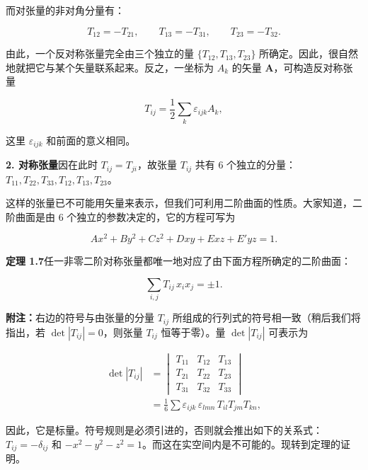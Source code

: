 \documentclass[11pt,a4paper,oneside]{ctexbook}
\newcommand{\ve}[1]{\bm{#1}}
\begin{document}
而对张量的非对角分量有：

\begin{equation*}
T_{12} = -T_{21}, \qquad T_{13} = -T_{31}, \qquad T_{23} = -T_{32}.
\end{equation*}

由此，一个反对称张量完全由三个独立的量 $\{T_{12}, T_{13}, T_{23}\}$ 所确定。因此，很自然地就把它与某个矢量联系起来。反之，一坐标为 $A_k$ 的矢量 $\ve{A}$，可构造反对称张量

\begin{equation*}
T_{ij} = \frac{1}{2} \sum_{k} \varepsilon_{ijk} A_k,
\end{equation*}

这里 $\varepsilon_{ijk}$ 和前面的意义相同。

\textbf{2. 对称张量}\quad 因在此时 $T_{ij} = T_{ji}$，故张量 $T_{ij}$ 共有 6 个独立的分量：$T_{11}, T_{22}, T_{33}, T_{12}, T_{13}, T_{23}$。

这样的张量已不可能用矢量来表示，但我们可利用二阶曲面的性质。大家知道，二阶曲面是由 6 个独立的参数决定的，它的方程可写为

\begin{equation*}
A x^{2} + B y^{2} + C z^{2} + D xy + E xz + E' yz = 1.
\end{equation*}

\textbf{定理 1.7}\quad 任一非零二阶对称张量都唯一地对应了由下面方程所确定的二阶曲面：

\begin{equation}
\sum_{i,j} T_{ij}\, x_i x_j = \pm 1.
\tag{1.29}
\end{equation}

\textbf{附注：}右边的符号与由张量的分量 $T_{ij}$ 所组成的行列式的符号相一致（稍后我们将指出，若 $\det|T_{ij}| = 0$，则张量 $T_{ij}$ 恒等于零）。量 $\det|T_{ij}|$ 可表示为

\begin{equation}
\begin{aligned}
\det|T_{ij}| &=
\begin{vmatrix}
T_{11} & T_{12} & T_{13}\\
T_{21} & T_{22} & T_{23}\\
T_{31} & T_{32} & T_{33}
\end{vmatrix}\\
&= \frac{1}{6} \sum \varepsilon_{ijk}\, \varepsilon_{lmn}\, T_{il} T_{jm} T_{kn},
\end{aligned}
\tag{1.29a}
\end{equation}

因此，它是标量。符号规则是必须引进的，否则就会推出如下的关系式：$T_{ij} = -\delta_{ij}$ 和 $-x^{2} - y^{2} - z^{2} = 1$。而这在实空间内是不可能的。现转到定理的证明。
\end{document}
